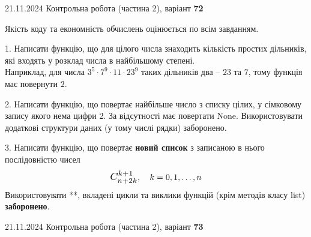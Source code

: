 \documentclass[12pt, ukrainian]{article}
\begin{document}
{{{{{{{{{{{{\begin {large}
\end{large}
\newpage
{{21.11.2024 Контрольна робота  (частина 2), варіант  \No \textbf { 72 }\par}}


{
\begin {large}
Якість коду та економність обчислень оцінюється по всім завданням.

\vspace{5mm}

1. Написати функцію, що для цілого числа знаходить кількість простих дільників, які входять у розклад числа в найбільшому степені. \\ Наприклад, для числа $3^5{\cdot}7^9{\cdot}11{\cdot}23^{9}$ таких дільників два – $23$ та $7$, тому функція має повернути $2$.

\vspace{10mm}


2. Написати функцію, що повертає найбільше число з списку цілих, у сімковому запису якого нема цифри 2. За відсутності має повертати None. Використовувати додаткові структури даних (у тому числі рядки) заборонено.

\vspace{10mm}


3. 
Написати функцію, що повертає \textbf{новий список} з записаною в нього послідовністю чисел
$$\scalebox{1.2}{$C_{n+2k}^{k+1}$}, \quad k=0,1,\ldots,n$$
Використовувати **, вкладені цикли та виклики функцій (крім методів класу list) \textbf{заборонено}.

\end{large}
\vspace{25mm}


{{21.11.2024 Контрольна робота  (частина 2), варіант  \No \textbf { 73 }\par}}


}}}}}}}}}}}}}
\end{document}

